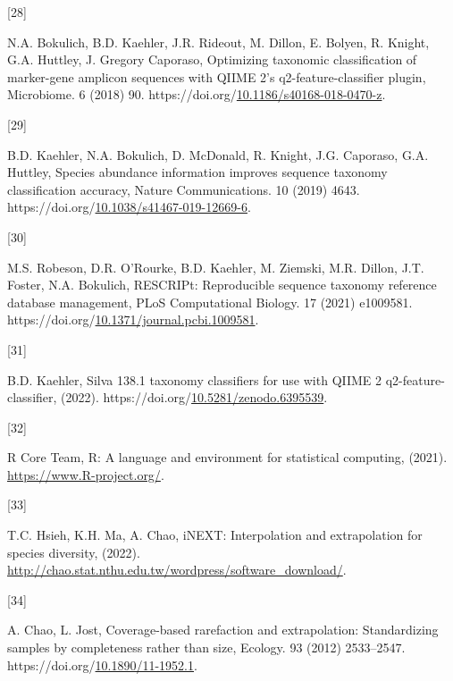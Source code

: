 \documentclass[preprint,3p,
a4paper]{elsarticle} %
\newlength{\cslhangindent}
\newlength{\csllabelwidth}
\newlength{\cslentryspacingunit} %
\newenvironment{CSLReferences}[2] %
 {%
  \setlength{\parindent}{0pt}
  \ifodd #1
  \let\oldpar\par
  \def\par{\hangindent=\cslhangindent\oldpar}
  \fi
  \setlength{\parskip}{#2\cslentryspacingunit}
 }%
 {}
\newcommand{\CSLLeftMargin}[1]{\parbox[t]{\csllabelwidth}{#1}}
\newcommand{\CSLRightInline}[1]{\parbox[t]{\linewidth - \csllabelwidth}{#1}\break}
\begin{document}
\begin{CSLReferences}{0}{0}
\leavevmode{}%
\CSLLeftMargin{{[}28{]} }%
\CSLRightInline{N.A. Bokulich, B.D. Kaehler, J.R. Rideout, M. Dillon, E.
Bolyen, R. Knight, G.A. Huttley, J. Gregory Caporaso, Optimizing
taxonomic classification of marker-gene amplicon sequences with QIIME
2's q2-feature-classifier plugin, Microbiome. 6 (2018) 90.
https://doi.org/\href{https://doi.org/10.1186/s40168-018-0470-z}{10.1186/s40168-018-0470-z}.}

\leavevmode{}%
\CSLLeftMargin{{[}29{]} }%
\CSLRightInline{B.D. Kaehler, N.A. Bokulich, D. McDonald, R. Knight,
J.G. Caporaso, G.A. Huttley, Species abundance information improves
sequence taxonomy classification accuracy, Nature Communications. 10
(2019) 4643.
https://doi.org/\href{https://doi.org/10.1038/s41467-019-12669-6}{10.1038/s41467-019-12669-6}.}

\leavevmode{}%
\CSLLeftMargin{{[}30{]} }%
\CSLRightInline{M.S. Robeson, D.R. O'Rourke, B.D. Kaehler, M. Ziemski,
M.R. Dillon, J.T. Foster, N.A. Bokulich, RESCRIPt: Reproducible sequence
taxonomy reference database management, PLoS Computational Biology. 17
(2021) e1009581.
https://doi.org/\href{https://doi.org/10.1371/journal.pcbi.1009581}{10.1371/journal.pcbi.1009581}.}

\leavevmode{}%
\CSLLeftMargin{{[}31{]} }%
\CSLRightInline{B.D. Kaehler, Silva 138.1 taxonomy classifiers for use
with QIIME 2 q2-feature-classifier, (2022).
https://doi.org/\href{https://doi.org/10.5281/zenodo.6395539}{10.5281/zenodo.6395539}.}

\leavevmode{}%
\CSLLeftMargin{{[}32{]} }%
\CSLRightInline{R Core Team, R: A language and environment for
statistical computing, (2021). \url{https://www.R-project.org/}.}

\leavevmode{}%
\CSLLeftMargin{{[}33{]} }%
\CSLRightInline{T.C. Hsieh, K.H. Ma, A. Chao, iNEXT: Interpolation and
extrapolation for species diversity, (2022).
\url{http://chao.stat.nthu.edu.tw/wordpress/software_download/}.}

\leavevmode{}%
\CSLLeftMargin{{[}34{]} }%
\CSLRightInline{A. Chao, L. Jost, Coverage-based rarefaction and
extrapolation: Standardizing samples by completeness rather than size,
Ecology. 93 (2012) 2533--2547.
https://doi.org/\href{https://doi.org/10.1890/11-1952.1}{10.1890/11-1952.1}.}


\end{CSLReferences}
\end{document}
